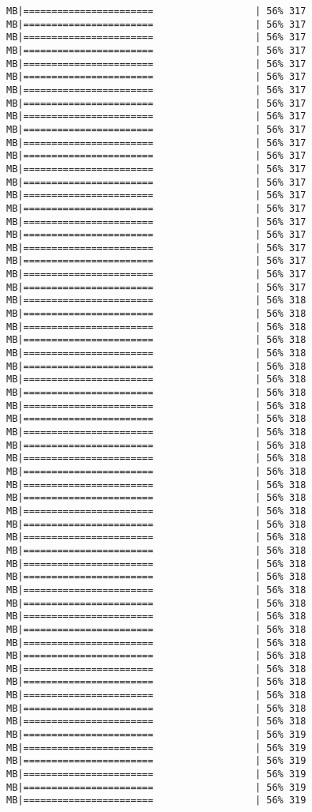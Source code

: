 \documentclass[
]{article}
\begin{document}
\begin{verbatim}
MB|=======================                  | 56% 317 MB|=======================                  | 56% 317 MB|=======================                  | 56% 317 MB|=======================                  | 56% 317 MB|=======================                  | 56% 317 MB|=======================                  | 56% 317 MB|=======================                  | 56% 317 MB|=======================                  | 56% 317 MB|=======================                  | 56% 317 MB|=======================                  | 56% 317 MB|=======================                  | 56% 317 MB|=======================                  | 56% 317 MB|=======================                  | 56% 317 MB|=======================                  | 56% 317 MB|=======================                  | 56% 317 MB|=======================                  | 56% 317 MB|=======================                  | 56% 317 MB|=======================                  | 56% 317 MB|=======================                  | 56% 317 MB|=======================                  | 56% 317 MB|=======================                  | 56% 317 MB|=======================                  | 56% 317 MB|=======================                  | 56% 318 MB|=======================                  | 56% 318 MB|=======================                  | 56% 318 MB|=======================                  | 56% 318 MB|=======================                  | 56% 318 MB|=======================                  | 56% 318 MB|=======================                  | 56% 318 MB|=======================                  | 56% 318 MB|=======================                  | 56% 318 MB|=======================                  | 56% 318 MB|=======================                  | 56% 318 MB|=======================                  | 56% 318 MB|=======================                  | 56% 318 MB|=======================                  | 56% 318 MB|=======================                  | 56% 318 MB|=======================                  | 56% 318 MB|=======================                  | 56% 318 MB|=======================                  | 56% 318 MB|=======================                  | 56% 318 MB|=======================                  | 56% 318 MB|=======================                  | 56% 318 MB|=======================                  | 56% 318 MB|=======================                  | 56% 318 MB|=======================                  | 56% 318 MB|=======================                  | 56% 318 MB|=======================                  | 56% 318 MB|=======================                  | 56% 318 MB|=======================                  | 56% 318 MB|=======================                  | 56% 318 MB|=======================                  | 56% 318 MB|=======================                  | 56% 318 MB|=======================                  | 56% 318 MB|=======================                  | 56% 318 MB|=======================                  | 56% 319 MB|=======================                  | 56% 319 MB|=======================                  | 56% 319 MB|=======================                  | 56% 319 MB|=======================                  | 56% 319 MB|=======================                  | 56% 319 
\end{verbatim}
\end{document}
